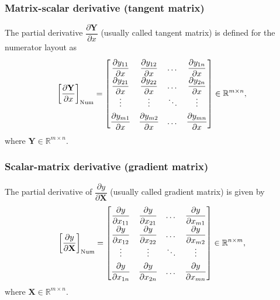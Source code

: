 \subsubsection{Matrix-scalar derivative (tangent matrix)}
The partial derivative \(\dfrac{\partial \mathbf{Y}}{\partial x}\) (usually called tangent matrix) is defined for the numerator layout as
\begin{align}
    \label{eq:tangent-num}
    \left[\dfrac{\partial \mathbf{Y}}{\partial x}\right]_{\textnormal{Num}} \renewcommand{\arraystretch}{1.8} = \begin{bmatrix}
        \dfrac{\partial y_{11}}{\partial x} & \dfrac{\partial y_{12}}{\partial x} & \dots & \dfrac{\partial y_{1n}}{\partial x} \\
        \dfrac{\partial y_{21}}{\partial x} & \dfrac{\partial y_{22}}{\partial x} & \dots & \dfrac{\partial y_{2n}}{\partial x} \\
        \vdots & \vdots & \ddots & \vdots \\
        \dfrac{\partial y_{m1}}{\partial x} & \dfrac{\partial y_{m2}}{\partial x} & \dots & \dfrac{\partial y_{mn}}{\partial x} \\
    \end{bmatrix} \in \mathbb{R}^{m \times n},
\end{align}
where \(\mathbf{Y} \in \mathbb{R}^{m \times n}\).

\subsubsection{Scalar-matrix derivative (gradient matrix)}
The partial derivative of \(\dfrac{\partial y}{\partial \mathbf{X}}\) (usually called gradient matrix) is given by
\begin{align}
    \label{eq:gradient-matrix-num}
    \renewcommand{\arraystretch}{1.8}
			\left[\dfrac{\partial y}{\partial \mathbf{X}}\right]_{\textnormal{Num}} = \begin{bmatrix}
				\dfrac{\partial y}{\partial x_{11}} & \dfrac{\partial y}{\partial x_{21}} & \dots & \dfrac{\partial y}{\partial x_{m1}} \\
				\dfrac{\partial y}{\partial x_{12}} & \dfrac{\partial y}{\partial x_{22}} & \dots & \dfrac{\partial y}{\partial x_{m2}} \\
				\vdots & \vdots & \ddots & \vdots \\
				\dfrac{\partial y}{\partial x_{1n}} & \dfrac{\partial y}{\partial x_{2n}} & \dots & \dfrac{\partial y}{\partial x_{mn}} \\
			\end{bmatrix} \in \mathbb{R}^{n \times m},
\end{align}
where \(\mathbf{X} \in \mathbb{R}^{m \times n}\).


